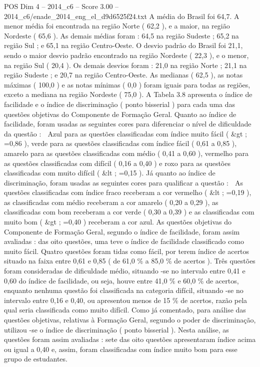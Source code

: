 \begin{textsample}{POS Dim 4 – 2014\_c6 – Score 3.00 – 2014\_c6/enade\_2014\_eng\_el\_d9d6525f24.txt}
A média do Brasil foi 64,7.
A menor média foi encontrada na região Norte ( 62,2 ), e a maior, na região Nordeste ( 65,6 ).
As demais médias foram : 64,5 na região Sudeste ; 65,2 na região Sul ; e 65,1 na região Centro-Oeste.
O desvio padrão do Brasil foi 21,1, sendo o maior desvio padrão encontrado na região Nordeste ( 22,3 ), e o menor, na região Sul ( 20,4 ).
Os demais desvios foram : 21,0 na região Norte ; 21,1 na região Sudeste ; e 20,7 na região Centro-Oeste.
As medianas ( 62,5 ), as notas máximas ( 100,0 ) e as notas mínimas ( 0,0 ) foram iguais para todas as regiões, exceto a mediana na região Nordeste ( 75,0 ).
A Tabela 3.8 apresenta o índice de facilidade e o índice de discriminação ( ponto bisserial ) para cada uma das questões objetivas do Componente de Formação Geral.
Quanto ao índice de facilidade, foram usadas as seguintes cores para diferenciar o nível de dificuldade da questão :  Azul para as questões classificadas com índice muito fácil ( \&gt ; =0,86 ), verde para as questões classificadas com índice fácil ( 0,61 a 0,85 ), amarelo para as questões classificadas com médio ( 0,41 a 0,60 ), vermelho para as questões classificadas com difícil ( 0,16 a 0,40 ) e roxo para as questões classificadas com muito difícil ( \&lt ; =0,15 ).
Já quanto ao índice de discriminação, foram usadas as seguintes cores para qualificar a questão :  As questões classificadas com índice fraco receberam a cor vermelho ( \&lt ; =0,19 ), as classificadas com médio receberam a cor amarelo ( 0,20 a 0,29 ), as classificadas com bom receberam a cor verde ( 0,30 a 0,39 ) e as classificadas com muito bom ( \&gt ; =0,40 ) receberam a cor azul.
As questões objetivas do Componente de Formação Geral, segundo o índice de facilidade, foram assim avaliadas : das oito questões, uma teve o índice de facilidade classificado como muito fácil.
Quatro questões foram tidas como fácil, por terem índice de acertos situado na faixa entre 0,61 e 0,85 ( de 61,0 \% a 85,0 \% de acertos ).
Três questões foram consideradas de dificuldade médio, situando -se no intervalo entre 0,41 e 0,60 do índice de facilidade, ou seja, houve entre 41,0 \% e 60,0 \% de acertos, enquanto nenhuma questão foi classificada na categoria difícil, situando -se no intervalo entre 0,16 e 0,40, ou apresentou menos de 15 \% de acertos, razão pela qual seria classificada como muito difícil.
Como já comentado, para análise das questões objetivas, relativas à Formação Geral, segundo o poder de discriminação, utilizou -se o índice de discriminação ( ponto bisserial ).
Nesta análise, as questões foram assim avaliadas : sete das oito questões apresentaram índice acima ou igual a 0,40 e, assim, foram classificadas com índice muito bom para esse grupo de estudantes.

\end{textsample}
